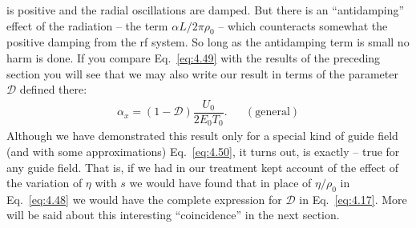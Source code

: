  is positive and the radial oscillations are damped. But there is an ``antidamping'' effect of the radiation -- the term $\alpha L/2\pi\rho_0$ -- which counteracts somewhat the positive damping from the rf system. So long as the antidamping term is small no harm is done.
If you compare Eq.~\eqref{eq:4.49} with the results of the preceding section you will see that we may also write our result in terms of the parameter $\mathscr{D}$ defined there:
\begin{align}\label{eq:4.50}
	\alpha_x = (1-\mathscr{D}) \dfrac{U_0}{2E_0 T_0}. && (\text{general})
\end{align}
Although we have demonstrated this result only for a special kind of guide field (and with some approximations) Eq.~\eqref{eq:4.50}, it turns out, is exactly -- true for any guide field. That is, if we had in our treatment kept account of the effect of the variation of $\eta$ with $s$ we would have found that in place of $\eta/\rho_0$ in Eq.~\eqref{eq:4.48} we would have the complete expression for $\mathscr{D}$ in Eq.~\eqref{eq:4.17}. More will be said about this interesting ``coincidence'' in the next section.
